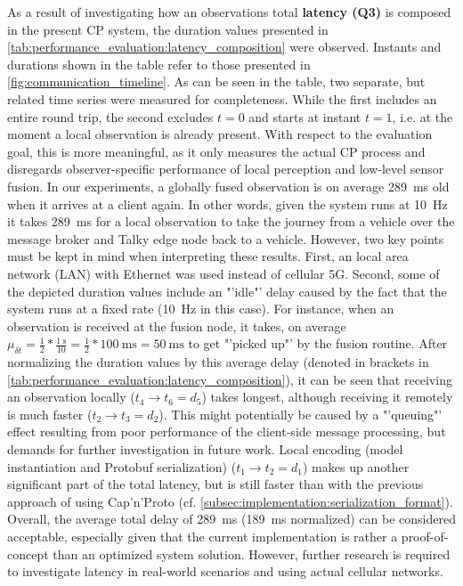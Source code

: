 As a result of investigating how an observations total \textbf{latency (Q3)} is composed in the present CP system, the duration values presented in \cref{tab:performance_evaluation:latency_composition} were observed. Instants and durations shown in the table refer to those presented in \cref{fig:communication_timeline}. As can be seen in the table, two separate, but related time series were measured for completeness. While the first includes an entire round trip, the second excludes $t=0$ and starts at instant $t=1$, i.e. at the moment a local observation is already present. With respect to the evaluation goal, this is more meaningful, as it only measures the actual CP process and disregards observer-specific performance of local perception and low-level sensor fusion. In our experiments, a globally fused observation is on average \SI{289}{\milli\second} old when it arrives at a client again. In other words, given the system runs at \SI{10}{\hertz} it takes \SI{289}{\milli\second} for a local observation to take the journey from a vehicle over the message broker and Talky edge node back to a vehicle. However, two key points must be kept in mind when interpreting these results. First, an local area network (LAN) with Ethernet was used instead of cellular 5G. Second, some of the depicted duration values include an "'idle"' delay caused by the fact that the system runs at a fixed rate (\SI{10}{\hertz} in this case). For instance, when an observation is received at the fusion node, it takes, on average $\mu_{\delta t} = \frac{1}{2} * \frac{\SI{1}{\second}}{10} = \frac{1}{2} *  \SI{100}{\milli\second} = \SI{50}{\milli\second}$ to get "'picked up"' by the fusion routine. After normalizing the duration values by this average delay (denoted in brackets in \cref{tab:performance_evaluation:latency_composition}), it can be seen that receiving an observation locally ($t_4 \rightarrow t_6 = d_5$) takes longest, although receiving it remotely is much faster ($t_2 \rightarrow t_3 = d_2$). This might potentially be caused by a "'queuing"' effect resulting from poor performance of the client-side message processing, but demands for further investigation in future work. Local encoding (model instantiation and Protobuf serialization) ($t_1 \rightarrow t_2 = d_1$) makes up another significant part of the total latency, but is still faster than with the previous approach of using Cap'n'Proto (cf. \cref{subsec:implementation:serialization_format}). Overall, the average total delay of \SI{289}{\milli\second} (\SI{189}{\milli\second} normalized) can be considered acceptable, especially given that the current implementation is rather a proof-of-concept than an optimized system solution. However, further research is required to investigate latency in real-world scenarios and using actual cellular networks.

